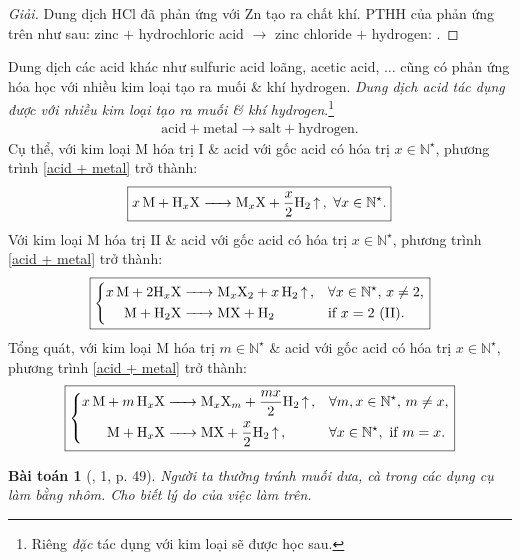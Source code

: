\documentclass{article}
\newtheorem{baitoan}{Bài toán}
\begin{document}
\begin{proof}[Giải]
	Dung dịch HCl đã phản ứng với Zn tạo ra chất khí. PTHH của phản ứng trên như sau: zinc $+$ hydrochloric acid $\to$ zinc chloride $+$ hydrogen: .
\end{proof}
Dung dịch các acid khác như sulfuric acid loãng, acetic acid, $\ldots$ cũng có phản ứng hóa học với nhiều kim loại tạo ra muối \& khí hydrogen. \textit{Dung dịch acid tác dụng được với nhiều kim loại tạo ra muối \& khí hydrogen}.\footnote{Riêng  \textit{đặc} tác dụng với kim loại sẽ được học sau.}
\begin{align}
	\label{acid + metal}
	\boxed{\mbox{acid} + \mbox{metal}\to\mbox{salt} + \mbox{hydrogen}.}
\end{align}
Cụ thể, với kim loại M hóa trị I \& acid  với gốc acid  có hóa trị $x\in\mathbb{N}^\star$, phương trình \eqref{acid + metal} trở thành:
\begin{align}
	\boxed{\ce{$x$M + H_xX -> M_xX + $\frac{x}{2}$H2 ^},\ \forall x\in\mathbb{N}^\star.}
\end{align}
Với kim loại M hóa trị II \& acid  với gốc acid  có hóa trị $x\in\mathbb{N}^\star$, phương trình \eqref{acid + metal} trở thành:
\begin{equation}
	\boxed{\left\{\begin{split}
			\ce{$x$M + $2$H_xX &-> M_xX2 + $x$H2 ^},&&\forall x\in\mathbb{N}^\star,\,x\ne2,\\
			\ce{M + H2X &-> MX + H2}&&\mbox{if } x = 2\ (\mbox{II}).
		\end{split}\right.}
\end{equation}
Tổng quát, với kim loại M hóa trị $m\in\mathbb{N}^\star$ \& acid  với gốc acid  có hóa trị $x\in\mathbb{N}^\star$, phương trình \eqref{acid + metal} trở thành:
\begin{equation}
	\boxed{\left\{\begin{split}
			\ce{$x$M + $m$H_xX &-> M_xX_m + $\frac{mx}{2}$H2 ^},&&\forall m,x\in\mathbb{N}^\star,\,m\ne x,\\
			\ce{M + H_xX &-> MX + $\frac{x}{2}$H2 ^},&&\forall x\in\mathbb{N}^\star,\mbox{ if } m = x.
		\end{split}\right.}
\end{equation}

\begin{baitoan}[\cite{SGK_KHTN_8_Canh_Dieu}, 1, p. 49]
	Người ta thường tránh muối dưa, cà trong các dụng cụ làm bằng nhôm. Cho biết lý do của việc làm trên.
\end{baitoan}
\end{document}
